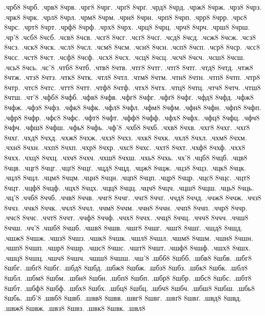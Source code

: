 {%
.чрб8
8чрб.
.чрв8
8чрв.
.чрг8
8чрг.
.чрґ8
8чрґ.
.чрд8
8чрд.
.чрж8
8чрж.
.чрз8
8чрз.
.чрк8
8чрк.
.чрл8
8чрл.
.чрм8
8чрм.
.чрн8
8чрн.
.чрп8
8чрп.
.чрр8
8чрр.
.чрс8
8чрс.
.чрт8
8чрт.
.чрф8
8чрф.
.чрх8
8чрх.
.чрц8
8чрц.
.чрч8
8чрч.
.чрш8
8чрш.
.чр'8
.чсб8
8чсб.
.чсв8
8чсв.
.чсг8
8чсг.
.чсґ8
8чсґ.
.чсд8
8чсд.
.чсж8
8чсж.
.чсз8
8чсз.
.чск8
8чск.
.чсл8
8чсл.
.чсм8
8чсм.
.чсн8
8чсн.
.чсп8
8чсп.
.чср8
8чср.
.чсс8
8чсс.
.чст8
8чст.
.чсф8
8чсф.
.чсх8
8чсх.
.чсц8
8чсц.
.чсч8
8чсч.
.чсш8
8чсш.
.чсь8
8чсь.
.чс'8
.чтб8
8чтб.
.чтв8
8чтв.
.чтг8
8чтг.
.чтґ8
8чтґ.
.чтд8
8чтд.
.чтж8
8чтж.
.чтз8
8чтз.
.чтк8
8чтк.
.чтл8
8чтл.
.чтм8
8чтм.
.чтн8
8чтн.
.чтп8
8чтп.
.чтр8
8чтр.
.чтс8
8чтс.
.чтт8
8чтт.
.чтф8
8чтф.
.чтх8
8чтх.
.чтц8
8чтц.
.чтч8
8чтч.
.чтш8
8чтш.
.чт'8
.чфб8
8чфб.
.чфв8
8чфв.
.чфг8
8чфг.
.чфґ8
8чфґ.
.чфд8
8чфд.
.чфж8
8чфж.
.чфз8
8чфз.
.чфк8
8чфк.
.чфл8
8чфл.
.чфм8
8чфм.
.чфн8
8чфн.
.чфп8
8чфп.
.чфр8
8чфр.
.чфс8
8чфс.
.чфт8
8чфт.
.чфф8
8чфф.
.чфх8
8чфх.
.чфц8
8чфц.
.чфч8
8чфч.
.чфш8
8чфш.
.чфь8
8чфь.
.чф'8
.чхб8
8чхб.
.чхв8
8чхв.
.чхг8
8чхг.
.чхґ8
8чхґ.
.чхд8
8чхд.
.чхж8
8чхж.
.чхз8
8чхз.
.чхк8
8чхк.
.чхл8
8чхл.
.чхм8
8чхм.
.чхн8
8чхн.
.чхп8
8чхп.
.чхр8
8чхр.
.чхс8
8чхс.
.чхт8
8чхт.
.чхф8
8чхф.
.чхх8
8чхх.
.чхц8
8чхц.
.чхч8
8чхч.
.чхш8
8чхш.
.чхь8
8чхь.
.чх'8
.чцб8
8чцб.
.чцв8
8чцв.
.чцг8
8чцг.
.чцґ8
8чцґ.
.чцд8
8чцд.
.чцж8
8чцж.
.чцз8
8чцз.
.чцк8
8чцк.
.чцл8
8чцл.
.чцм8
8чцм.
.чцн8
8чцн.
.чцп8
8чцп.
.чцр8
8чцр.
.чцс8
8чцс.
.чцт8
8чцт.
.чцф8
8чцф.
.чцх8
8чцх.
.чцц8
8чцц.
.чцч8
8чцч.
.чцш8
8чцш.
.чць8
8чць.
.чц'8
.ччб8
8ччб.
.ччв8
8ччв.
.ччг8
8ччг.
.ччґ8
8ччґ.
.ччд8
8ччд.
.ччж8
8ччж.
.ччз8
8ччз.
.ччк8
8ччк.
.ччл8
8ччл.
.ччм8
8ччм.
.ччн8
8ччн.
.ччп8
8ччп.
.ччр8
8ччр.
.ччс8
8ччс.
.ччт8
8ччт.
.ччф8
8ччф.
.ччх8
8ччх.
.ччц8
8ччц.
.ччч8
8ччч.
.ччш8
8ччш.
.чч'8
.чшб8
8чшб.
.чшв8
8чшв.
.чшг8
8чшг.
.чшґ8
8чшґ.
.чшд8
8чшд.
.чшж8
8чшж.
.чшз8
8чшз.
.чшк8
8чшк.
.чшл8
8чшл.
.чшм8
8чшм.
.чшн8
8чшн.
.чшп8
8чшп.
.чшр8
8чшр.
.чшс8
8чшс.
.чшт8
8чшт.
.чшф8
8чшф.
.чшх8
8чшх.
.чшц8
8чшц.
.чшч8
8чшч.
.чшш8
8чшш.
.чш'8
.шбб8
8шбб.
.шбв8
8шбв.
.шбг8
8шбг.
.шбґ8
8шбґ.
.шбд8
8шбд.
.шбж8
8шбж.
.шбз8
8шбз.
.шбк8
8шбк.
.шбл8
8шбл.
.шбм8
8шбм.
.шбн8
8шбн.
.шбп8
8шбп.
.шбр8
8шбр.
.шбс8
8шбс.
.шбт8
8шбт.
.шбф8
8шбф.
.шбх8
8шбх.
.шбц8
8шбц.
.шбч8
8шбч.
.шбш8
8шбш.
.шбь8
8шбь.
.шб'8
.швб8
8швб.
.швв8
8швв.
.швг8
8швг.
.швґ8
8швґ.
.швд8
8швд.
.швж8
8швж.
.швз8
8швз.
.швк8
8швк.
.швл8
}
